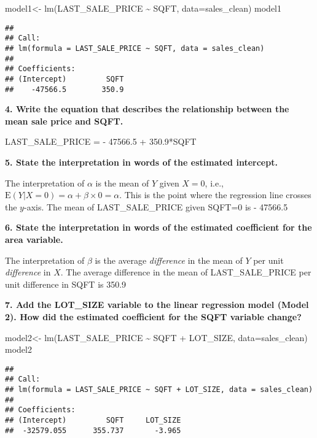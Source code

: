 \documentclass[
]{article}
\newenvironment{Shaded}{\begin{snugshade}}{\end{snugshade}}
\newcommand{\AttributeTok}[1]{\textcolor[rgb]{0.77,0.63,0.00}{#1}}
\newcommand{\FunctionTok}[1]{\textcolor[rgb]{0.00,0.00,0.00}{#1}}
\newcommand{\NormalTok}[1]{#1}
\newcommand{\OtherTok}[1]{\textcolor[rgb]{0.56,0.35,0.01}{#1}}
\newcommand{\SpecialCharTok}[1]{\textcolor[rgb]{0.00,0.00,0.00}{#1}}
\begin{document}
\begin{Shaded}
\begin{Highlighting}[]
\NormalTok{model1}\OtherTok{\textless{}{-}} \FunctionTok{lm}\NormalTok{(LAST\_SALE\_PRICE }\SpecialCharTok{\textasciitilde{}}\NormalTok{ SQFT, }\AttributeTok{data=}\NormalTok{sales\_clean)}
\NormalTok{model1}
\end{Highlighting}
\end{Shaded}

\begin{verbatim}
## 
## Call:
## lm(formula = LAST_SALE_PRICE ~ SQFT, data = sales_clean)
## 
## Coefficients:
## (Intercept)         SQFT  
##    -47566.5        350.9
\end{verbatim}

\textbf{4. Write the equation that describes the relationship between
the mean sale price and SQFT. }

LAST\_SALE\_PRICE = - 47566.5 + 350.9*SQFT

\textbf{5. State the interpretation in words of the estimated
intercept.}

The interpretation of \(\alpha\) is the mean of \(Y\) given \(X=0\),
i.e., \(\mbox{E}(Y | X=0) = \alpha + \beta \times 0 = \alpha\). This is
the point where the regression line crosses the \(y\)-axis. The mean of
LAST\_SALE\_PRICE given SQFT=0 is - 47566.5

\textbf{6. State the interpretation in words of the estimated
coefficient for the area variable.}

The interpretation of \(\beta\) is the average \emph{difference} in the
mean of \(Y\) per unit \emph{difference} in \(X\). The average
difference in the mean of LAST\_SALE\_PRICE per unit difference in SQFT
is 350.9

\textbf{7. Add the LOT\_SIZE variable to the linear regression model
(Model 2). How did the estimated coefficient for the SQFT variable
change?}

\begin{Shaded}
\begin{Highlighting}[]
\NormalTok{model2}\OtherTok{\textless{}{-}} \FunctionTok{lm}\NormalTok{(LAST\_SALE\_PRICE }\SpecialCharTok{\textasciitilde{}}\NormalTok{ SQFT }\SpecialCharTok{+}\NormalTok{ LOT\_SIZE, }\AttributeTok{data=}\NormalTok{sales\_clean)}
\NormalTok{model2}
\end{Highlighting}
\end{Shaded}

\begin{verbatim}
## 
## Call:
## lm(formula = LAST_SALE_PRICE ~ SQFT + LOT_SIZE, data = sales_clean)
## 
## Coefficients:
## (Intercept)         SQFT     LOT_SIZE  
##  -32579.055      355.737       -3.965
\end{verbatim}
\end{document}
